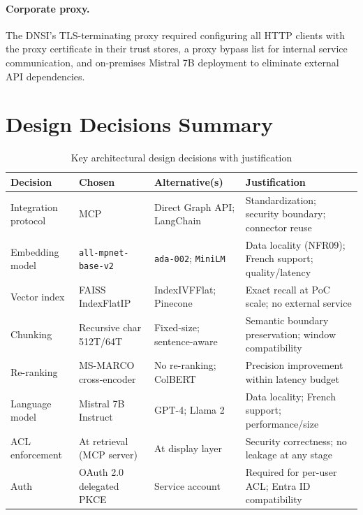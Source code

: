\paragraph{Corporate proxy.} The DNSI's TLS-terminating proxy required configuring all HTTP clients with the proxy certificate in their trust stores, a proxy bypass list for internal service communication, and on-premises Mistral 7B deployment to eliminate external API dependencies.

\section{Design Decisions Summary}
\label{sec:arch-decisions}

\begin{table}[H]
\centering
\caption{Key architectural design decisions with justification}
\label{tab:design-decisions}
\begin{tabularx}{\textwidth}{@{}lXXX@{}}
\toprule
\textbf{Decision} & \textbf{Chosen} & \textbf{Alternative(s)} & \textbf{Justification} \\
\midrule
Integration protocol & MCP & Direct Graph API; LangChain & Standardization; security boundary; connector reuse \\
Embedding model & \texttt{all-mpnet-base-v2} & \texttt{ada-002}; \texttt{MiniLM} & Data locality (NFR09); French support; quality/latency \\
Vector index & FAISS IndexFlatIP & IndexIVFFlat; Pinecone & Exact recall at PoC scale; no external service \\
Chunking & Recursive char 512T/64T & Fixed-size; sentence-aware & Semantic boundary preservation; window compatibility \\
Re-ranking & MS-MARCO cross-encoder & No re-ranking; ColBERT & Precision improvement within latency budget \\
Language model & Mistral 7B Instruct & GPT-4; Llama 2 & Data locality; French support; performance/size \\
ACL enforcement & At retrieval (MCP server) & At display layer & Security correctness; no leakage at any stage \\
Auth & OAuth 2.0 delegated PKCE & Service account & Required for per-user ACL; Entra ID compatibility \\
\bottomrule
\end{tabularx}
\end{table}

